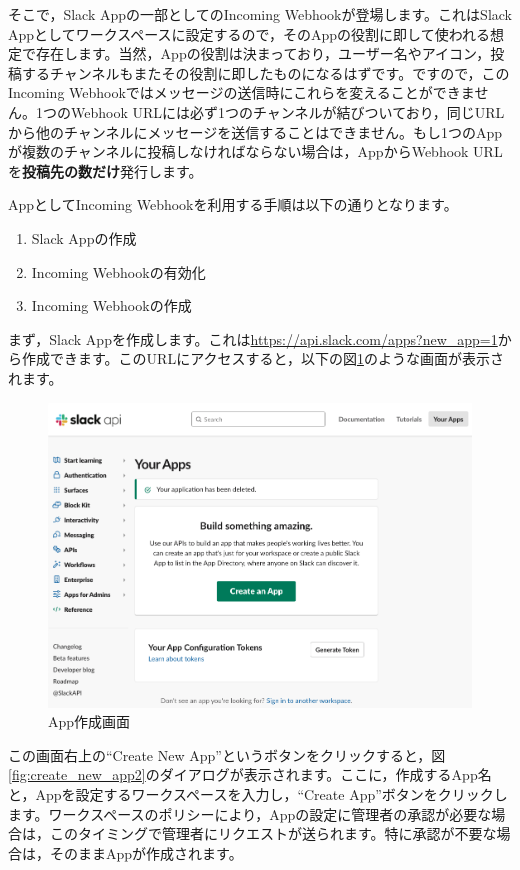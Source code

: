 \documentclass[uplatex,a4j]{jsarticle}
\begin{document}
そこで，Slack Appの一部としてのIncoming Webhookが登場します。これはSlack Appとしてワークスペースに設定するので，そのAppの役割に即して使われる想定で存在します。当然，Appの役割は決まっており，ユーザー名やアイコン，投稿するチャンネルもまたその役割に即したものになるはずです。ですので，このIncoming Webhookではメッセージの送信時にこれらを変えることができません。1つのWebhook URLには必ず1つのチャンネルが結びついており，同じURLから他のチャンネルにメッセージを送信することはできません。もし1つのAppが複数のチャンネルに投稿しなければならない場合は，AppからWebhook URLを\textbf{投稿先の数だけ}発行します。

AppとしてIncoming Webhookを利用する手順は以下の通りとなります。

\begin{enumerate}
\item Slack Appの作成
\item Incoming Webhookの有効化
\item Incoming Webhookの作成
\end{enumerate}

まず，Slack Appを作成します。これは\href{https://api.slack.com/apps?new_app=1}{https://api.slack.com/apps?new\_app=1}から作成できます。このURLにアクセスすると，以下の図\ref{fig:create_new_app}のような画面が表示されます。

\begin{figure}[H]
 \centering
 \includegraphics[keepaspectratio, scale=0.45]{images/create_new_app.png}
 \caption{App作成画面}
 \label{fig:create_new_app}
\end{figure}

この画面右上の``Create New App''というボタンをクリックすると，図\ref{fig:create_new_app2}のダイアログが表示されます。ここに，作成するApp名と，Appを設定するワークスペースを入力し，``Create App''ボタンをクリックします。ワークスペースのポリシーにより，Appの設定に管理者の承認が必要な場合は，このタイミングで管理者にリクエストが送られます。特に承認が不要な場合は，そのままAppが作成されます。
\end{document}
